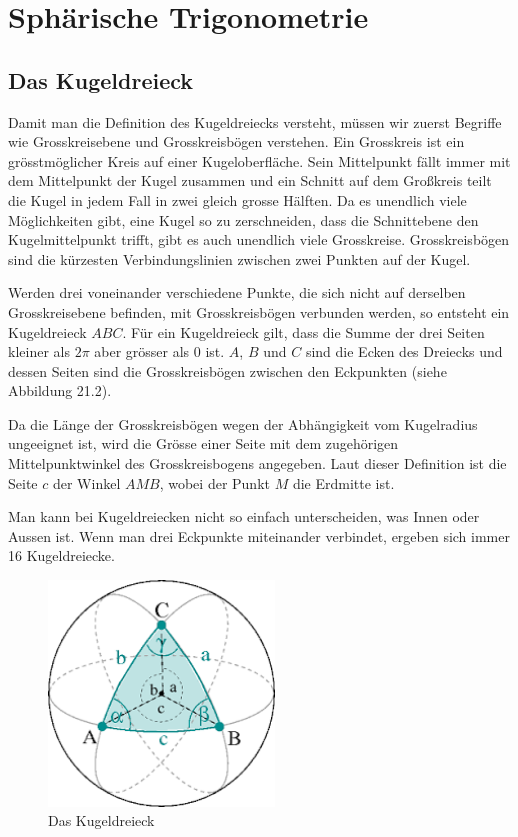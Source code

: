 
\section{Sphärische Trigonometrie}
\subsection{Das Kugeldreieck}
Damit man die Definition des Kugeldreiecks versteht, müssen wir zuerst Begriffe wie Grosskreisebene und Grosskreisbögen verstehen.
Ein Grosskreis ist ein grösstmöglicher Kreis auf einer Kugeloberfläche.
Sein Mittelpunkt fällt immer mit dem Mittelpunkt der Kugel zusammen und ein Schnitt auf dem Großkreis teilt die Kugel in jedem Fall in zwei gleich grosse Hälften.
Da es unendlich viele Möglichkeiten gibt, eine Kugel so zu zerschneiden, dass die Schnittebene den Kugelmittelpunkt trifft, gibt es auch unendlich viele Grosskreise.
Grosskreisbögen sind die kürzesten Verbindungslinien zwischen zwei Punkten auf der Kugel.

Werden drei voneinander verschiedene Punkte, die sich nicht auf derselben Grosskreisebene befinden, mit Grosskreisbögen verbunden werden, so entsteht ein Kugeldreieck $ABC$.
Für ein Kugeldreieck gilt, dass die Summe der drei Seiten kleiner als $2\pi$ aber grösser als 0 ist.
$A$, $B$ und $C$ sind die Ecken des Dreiecks und dessen Seiten sind die Grosskreisbögen zwischen den Eckpunkten (siehe Abbildung 21.2). 

Da die Länge der Grosskreisbögen wegen der Abhängigkeit vom Kugelradius ungeeignet ist, wird die Grösse einer Seite mit dem zugehörigen Mittelpunktwinkel des Grosskreisbogens angegeben. 
Laut dieser Definition ist die Seite $c$ der Winkel $AMB$, wobei der Punkt $M$ die Erdmitte ist.

Man kann bei Kugeldreiecken nicht so einfach unterscheiden, was Innen oder Aussen ist. 
Wenn man drei Eckpunkte miteinander verbindet, ergeben sich immer 16 Kugeldreiecke. 

\begin{figure}
	\begin{center}
		\includegraphics[width=6cm]{papers/nav/bilder/kugel1.png}
		\caption[Das Kugeldreieck]{Das Kugeldreieck}
	\end{center}
	
\end{figure}

